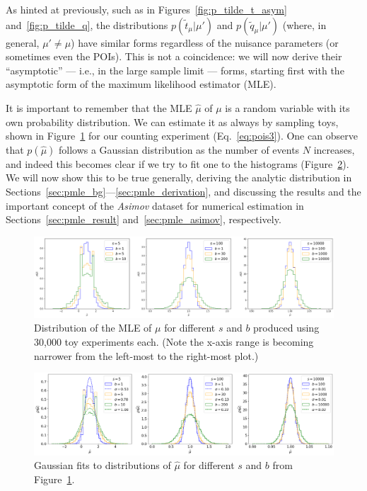 As hinted at previously, such as in Figures~\ref{fig:p_tilde_t_asym} and~\ref{fig:p_tilde_q}, the distributions $p(\tilde{t}_\mu|\mu')$ and $p(\tilde{q}_\mu|\mu')$ (where, in general, $\mu' \neq \mu$) have similar forms regardless of the nuisance parameters (or sometimes even the POIs).
This is not a coincidence: we will now derive their ``asymptotic'' --- i.e., in the large sample limit --- forms, starting first with the asymptotic form of the maximum likelihood estimator (MLE).

It is important to remember that the MLE $\hat \mu$ of $\mu$ is a random variable with its own probability distribution.
We can estimate it as always by sampling toys, shown in Figure~\ref{fig:p_mle} for our counting experiment (Eq.~\ref{eq:pois3}).
One can observe that $p(\hat \mu)$ follows a Gaussian distribution as the number of events $N$ increases, and indeed this becomes clear if we try to fit one to the histograms (Figure~\ref{fig:p_mle_fit}).
We will now show this to be true generally, deriving the analytic distribution in Sections~\ref{sec:pmle_bg}---\ref{sec:pmle_derivation}, and discussing the results and the important concept of the \textit{Asimov} dataset for numerical estimation in Sections~\ref{sec:pmle_result} and~\ref{sec:pmle_asimov}, respectively.

\begin{figure}[htb]
\centering
\includegraphics[width=\textwidth]{figures/05-asymptotic-mle/1.png}
\caption{Distribution of the MLE of $\mu$ for different $s$ and $b$ produced using 30,000 toy experiments each. (Note the x-axis range is becoming narrower from the left-most to the right-most plot.)}
\label{fig:p_mle}
\end{figure}

\begin{figure}[htb]
\centering
\includegraphics[width=\textwidth]{figures/05-asymptotic-mle/2.png}
\caption{Gaussian fits to distributions of $\hat\mu$ for different $s$ and $b$ from Figure~\ref{fig:p_mle}.}
\label{fig:p_mle_fit}
\end{figure}


